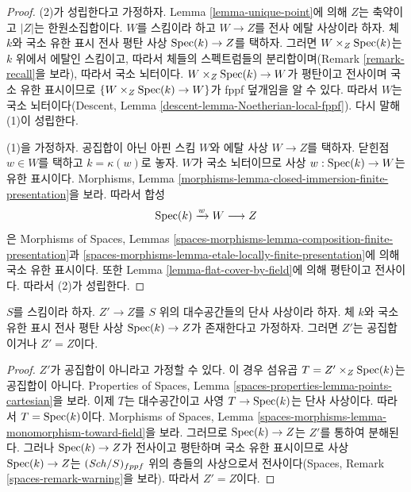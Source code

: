\begin{proof}
(2)가 성립한다고 가정하자. Lemma \ref{lemma-unique-point}에 의해
$Z$는 축약이고 $|Z|$는 한원소집합이다. $W$를 스킴이라 하고
$W \to Z$를 전사 에탈 사상이라 하자. 체 $k$와 국소 유한 표시 전사
평탄 사상 $\mathop{\mathrm{Spec}}(k) \to Z$를 택하자. 그러면
$W \times_Z \mathop{\mathrm{Spec}}(k)$는 $k$ 위에서 에탈인 스킴이고, 따라서 체들의
스펙트럼들의 분리합이며(Remark \ref{remark-recall}을 보라), 따라서
국소 뇌터이다. $W \times_Z \mathop{\mathrm{Spec}}(k) \to W$가 평탄이고 전사이며
국소 유한 표시이므로 $\{W \times_Z \mathop{\mathrm{Spec}}(k) \to W\}$가 fppf
덮개임을 알 수 있다. 따라서 $W$는 국소 뇌터이다(Descent, Lemma
\ref{descent-lemma-Noetherian-local-fppf}). 다시 말해 (1)이 성립한다.

\medskip\noindent
(1)을 가정하자. 공집합이 아닌 아핀 스킴 $W$와 에탈 사상
$W \to Z$를 택하자. 닫힌점 $w \in W$를 택하고
$k = \kappa(w)$로 놓자. $W$가 국소 뇌터이므로 사상
$w : \mathop{\mathrm{Spec}}(k) \to W$는 유한 표시이다. Morphisms, Lemma
\ref{morphisms-lemma-closed-immersion-finite-presentation}을 보라.
따라서 합성
$$
\mathop{\mathrm{Spec}}(k) \xrightarrow{w} W \longrightarrow Z
$$
은 Morphisms of Spaces, Lemmas
\ref{spaces-morphisms-lemma-composition-finite-presentation}과
\ref{spaces-morphisms-lemma-etale-locally-finite-presentation}에 의해
국소 유한 표시이다. 또한 Lemma \ref{lemma-flat-cover-by-field}에 의해
평탄이고 전사이다. 따라서 (2)가 성립한다.
\end{proof}

\begin{lemma}
\label{lemma-monomorphism-into-point}
$S$를 스킴이라 하자. $Z' \to Z$를 $S$ 위의 대수공간들의 단사 사상이라
하자. 체 $k$와 국소 유한 표시 전사 평탄 사상
$\mathop{\mathrm{Spec}}(k) \to Z$가 존재한다고 가정하자. 그러면 $Z'$는 공집합이거나
$Z' = Z$이다.
\end{lemma}

\begin{proof}
$Z'$가 공집합이 아니라고 가정할 수 있다. 이 경우 섬유곱
$T = Z' \times_Z \mathop{\mathrm{Spec}}(k)$는 공집합이 아니다. Properties of Spaces,
Lemma \ref{spaces-properties-lemma-points-cartesian}을 보라. 이제 $T$는
대수공간이고 사영 $T \to \mathop{\mathrm{Spec}}(k)$는 단사 사상이다. 따라서
$T = \mathop{\mathrm{Spec}}(k)$이다. Morphisms of Spaces, Lemma
\ref{spaces-morphisms-lemma-monomorphism-toward-field}을 보라.
그러므로 $\mathop{\mathrm{Spec}}(k) \to Z$는 $Z'$를 통하여 분해된다. 그러나
$\mathop{\mathrm{Spec}}(k) \to Z$가 전사이고 평탄하며 국소 유한 표시이므로 사상
$\mathop{\mathrm{Spec}}(k) \to Z$는 $(\mathit{Sch}/S)_{fppf}$ 위의 층들의 사상으로서
전사이다(Spaces, Remark
\ref{spaces-remark-warning}을 보라). 따라서 $Z' = Z$이다.
\end{proof}


